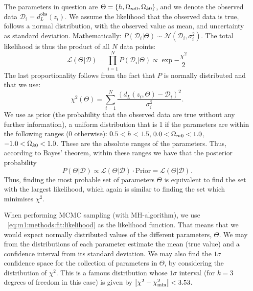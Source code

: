     The parameters in question are $\Theta = \{h, \Omega_{m0}, \Omega_{k0}\}$, and we denote the observed data $\mathcal{D}_i = d_L^\mathrm{obs}(z_i)$.
    We assume the likelihood that the observed data is true, follows a normal distribution, with the observed value as mean, and uncertainty as standard deviation. Mathematically: $P(\mathcal{D}_i|\Theta) \sim \mathcal{N}(\mathcal{D}_i, \sigma_i^2)$. The total likelihood is thus the product of all $N$ data points:
    \begin{equation}\label{eq:m1:methods:fit:likelihood}
        \mathcal{L}(\Theta|\mathcal{D}) = \prod_{i=1}^NP(\mathcal{D}_i|\Theta) \propto \exp{-\frac{\chi^2}{2}}
    \end{equation}
    The last proportionality follows from the fact that $P$ is normally distributed and that we use:
    \begin{equation}\label{eq:m1:methods:fit:chi2}
        \chi^2(\Theta) = \sum_{i=1}^N\frac{(d_L(z_i, \Theta)-\mathcal{D}_i)^2}{\sigma_i^2}.
    \end{equation}
    We use as prior (the probability that the observed data are true without any further information), a uniform distribution that is 1 if the parameters are within the following ranges (0 otherwise): $0.5 < h < 1.5$, $0.0 < \Omega_{m0} < 1.0$, $-1.0 < \Omega_{k0} < 1.0$. These are the absolute ranges of the parameters. Thus, according to Bayes' theorem, within these ranges we have that the posterior probability 
    \begin{equation}\label{eq:m1:methods:fit:posterior_prob}
        P(\Theta|\mathcal{D}) \propto \mathcal{L}(\Theta|\mathcal{D}) \cdot \mathrm{Prior} = \mathcal{L}(\Theta|\mathcal{D}). 
    \end{equation}
    Thus, finding the most probable set of parameters $\Theta$ is equivalent to find the set with the largest likelihood, which again is similar to finding the set which minimises $\chi^2$. 

    When performing MCMC sampling (with MH-algorithm), we use ~\cref{eq:m1:methods:fit:likelihood} as the likelihood function. That means that we would expect normally distributed values of the different parameters, $\Theta$. We may from the distributions of each parameter estimate the mean (true value) and a confidence interval from its standard deviation. We may also find the $1\sigma$ confidence space for the collection of parameters in $\Theta$, by considering the distribution of $\chi^2$. This is a famous distribution whose $1\sigma$ interval (for $k=3$ degrees of freedom in this case) is given by $\abs{\chi^2-\chi^2_\mathrm{min}} < 3.53$. 
    
